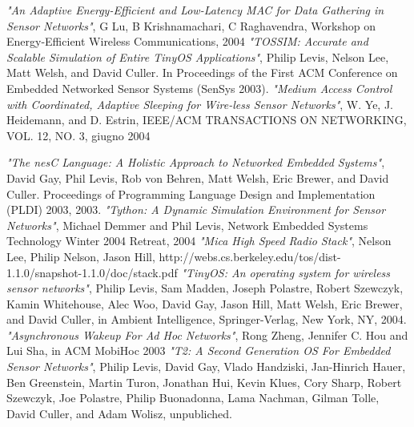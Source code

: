 \documentclass[twoside,11pt,a4paper,italian,openany]{book}
\begin{document}
\begin{thebibliography}{99}
 \emph{"An Adaptive Energy-Efficient and Low-Latency MAC for Data Gathering in Sensor Networks"}, G Lu, B Krishnamachari, C Raghavendra, Workshop on Energy-Efficient Wireless Communications, 2004 
\emph{"TOSSIM: Accurate and Scalable Simulation of Entire TinyOS Applications"}, Philip Levis, Nelson Lee, Matt Welsh, and David Culler. In Proceedings of the First ACM Conference on Embedded Networked Sensor Systems (SenSys 2003).  
\emph{"Medium Access Control with Coordinated, Adaptive Sleeping for Wire-less Sensor Networks"}, W. Ye, J. Heidemann, and D. Estrin, IEEE/ACM TRANSACTIONS ON NETWORKING, VOL. 12, NO. 3, giugno 2004

\emph{"The nesC Language: A Holistic Approach to Networked Embedded Systems"}, David Gay, Phil Levis, Rob von Behren, Matt Welsh, Eric Brewer, and David Culler. Proceedings of Programming Language Design and Implementation (PLDI) 2003, 2003.
\emph{"Tython: A Dynamic Simulation Environment for Sensor Networks"}, Michael Demmer and Phil Levis, Network Embedded Systems Technology Winter 2004 Retreat, 2004
\emph{"Mica High Speed Radio Stack"}, Nelson Lee, Philip Nelson, Jason Hill, http://webs.cs.berkeley.edu/tos/dist-1.1.0/snapshot-1.1.0/doc/stack.pdf
\emph{"TinyOS: An operating system for wireless sensor networks"}, Philip Levis, Sam Madden, Joseph Polastre, Robert Szewczyk, Kamin Whitehouse, Alec Woo, David Gay, Jason Hill, Matt Welsh, Eric Brewer, and David Culler, in Ambient Intelligence, Springer-Verlag, New York, NY, 2004.
\emph{"Asynchronous Wakeup For Ad Hoc Networks"}, Rong Zheng, Jennifer C. Hou and Lui Sha,  in ACM MobiHoc 2003
 \emph{"T2: A Second Generation OS For Embedded Sensor Networks"}, Philip Levis, David Gay, Vlado Handziski, Jan-Hinrich Hauer, Ben Greenstein, Martin Turon, Jonathan Hui, Kevin Klues, Cory Sharp, Robert Szewczyk, Joe Polastre, Philip Buonadonna, Lama Nachman, Gilman Tolle, David Culler, and Adam Wolisz, unpubliched. 


\end{thebibliography}
\end{document}
